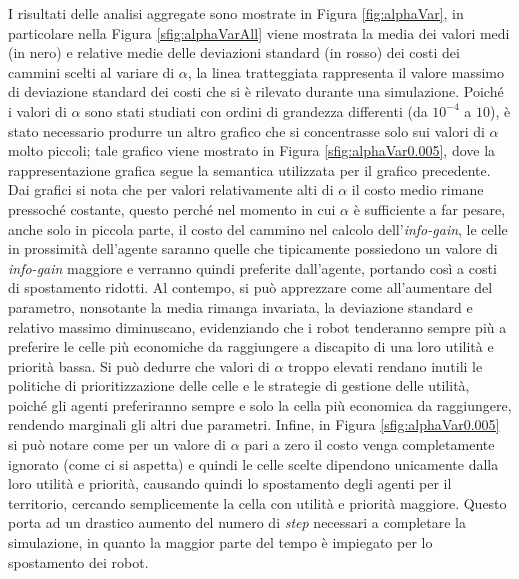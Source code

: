I risultati delle analisi aggregate sono mostrate in Figura \ref{fig:alphaVar}, in particolare nella Figura \ref{sfig:alphaVarAll} viene mostrata la media dei valori medi (in nero) e relative medie delle deviazioni standard (in rosso) dei costi dei cammini scelti al variare di $\alpha$, la linea tratteggiata rappresenta il valore massimo di deviazione standard dei costi che si è rilevato durante una simulazione.
Poiché i valori di $\alpha$ sono stati studiati con ordini di grandezza differenti (da $10^{-4}$ a $10$), è stato necessario produrre un altro grafico che si concentrasse solo sui valori di $\alpha$ molto piccoli; tale grafico viene mostrato in Figura \ref{sfig:alphaVar0.005}, dove la rappresentazione grafica segue la semantica utilizzata per il grafico precedente.
Dai grafici si nota che per valori relativamente alti di $\alpha$ il costo medio rimane pressoché costante, questo perché nel momento in cui $\alpha$ è sufficiente a far pesare, anche solo in piccola parte, il costo del cammino nel calcolo dell'\textit{info-gain}, le celle in prossimità dell'agente saranno quelle che tipicamente possiedono un valore di \textit{info-gain} maggiore e verranno quindi preferite dall'agente, portando così a costi di spostamento ridotti.
Al contempo, si può apprezzare come all'aumentare del parametro, nonsotante la media rimanga invariata, la deviazione standard e relativo massimo diminuscano, evidenziando che i robot tenderanno sempre più a preferire le celle più economiche da raggiungere a discapito di una loro utilità e priorità bassa.
Si può dedurre che valori di $\alpha$ troppo elevati rendano inutili le politiche di prioritizzazione delle celle e le strategie di gestione delle utilità, poiché gli agenti preferiranno sempre e solo la cella più economica da raggiungere, rendendo marginali gli altri due parametri.
Infine, in Figura \ref{sfig:alphaVar0.005} si può notare come per un valore di $\alpha$ pari a zero il costo venga completamente ignorato (come ci si aspetta) e quindi le celle scelte dipendono unicamente dalla loro utilità e priorità, causando quindi lo spostamento degli agenti per il territorio, cercando semplicemente la cella con utilità e priorità maggiore. Questo porta ad un drastico aumento del numero di \textit{step} necessari a completare la simulazione, in quanto la maggior parte del tempo è impiegato per lo spostamento dei robot.
